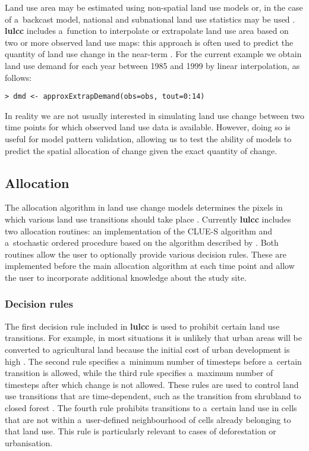 \documentclass{icldt}\usepackage[]{graphicx}\usepackage[]{color}
\begin{document}
Land use area may be estimated using non-spatial land use models or, in the case of a~backcast model, national and subnational land use statistics may be used \citep[e.g.][]{ray2010,fuchs2013}. \textbf{lulcc} includes a~function to interpolate or extrapolate land use area based on two or more observed land use maps: this approach is often used to predict the quantity of land use change in the near-term \citep{mas2014}. For the current example we obtain land use demand for each year between 1985 and 1999 by linear interpolation, as follows:
\begin{verbatim}
> dmd <- approxExtrapDemand(obs=obs, tout=0:14)
\end{verbatim}
\noindent In reality we are not usually interested in simulating land use change between two time points for which observed land use data is available. However, doing so is useful for model pattern validation, allowing us to test the ability of models to predict the spatial allocation of change given the exact quantity of change. \\

\subsection{Allocation}
The allocation algorithm in land use change models determines the pixels in which various land use transitions should take place \citep{verburg2002}. Currently \textbf{lulcc} includes two allocation routines: an implementation of the CLUE-S algorithm and a~stochastic ordered procedure based on the algorithm described by \citet{fuchs2013}. Both routines allow the user to optionally provide various decision rules. These are implemented before the main allocation algorithm at each time point and allow the user to incorporate additional knowledge about the study site. \\

\subsubsection{Decision rules}

The first decision rule included in \textbf{lulcc} is used to prohibit certain land use transitions. For example, in most situations it is unlikely that urban areas will be converted to agricultural land because the initial cost of urban development is high \citep{verburg2002}. The second rule specifies a~minimum number of timesteps before a~certain transition is allowed, while the third rule specifies a~maximum number of timesteps after which change is not allowed. These rules are used to control land use transitions that are time-dependent, such as the transition from shrubland to closed forest \citep{verburg2009}. The fourth rule prohibits transitions to a~certain land use in cells that are not within a~user-defined neighbourhood of cells already belonging to that land use. This rule is particularly relevant to cases of deforestation or urbanisation. \\
\end{document}
